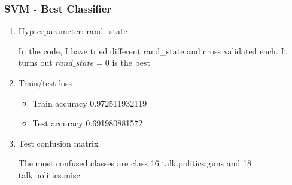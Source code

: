 \documentclass[letterpaper, 12]{article}
\begin{document}
\subsubsection{SVM - Best Classifier}
\begin{enumerate}

    \item Hypterparameter: rand\_state
	
	In the code, I have tried different rand\_state and cross validated each. It turns out $rand\_state = 0$ is the best
	
	\item Train/test loss
	\begin{itemize}
     \item  Train accuracy  0.972511932119
     \item Test accuracy 0.691980881572
        \end{itemize}
        \item Test confusion matrix
        
        The most confused classes are class 16 talk.politics.guns and 18 talk.politics.misc


\end{enumerate}
\end{document}
